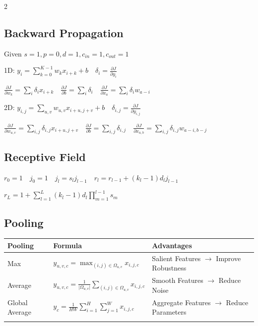 \documentclass[a4paper]{article}
\newlength{\activationwidth}
\let\originalsum\sum
\let\originalprod\prod
\renewcommand{\sum}{\mathop{\textstyle\originalsum}\nolimits}
\renewcommand{\prod}{\mathop{\textstyle\originalprod}\nolimits}
\begin{document}
\begin{multicols}{2}
\subsection*{Backward Propagation}
\noindent Given \(\displaystyle s=1, p=0, d=1, c_{in}=1, c_{out}=1\)\par
\noindent 1D: \(\displaystyle y_i=\sum_{k=0}^{K-1}w_kx_{i+k}+b \quad \delta_i=\frac{\partial J}{\partial y_i}\)\par
\noindent \(\displaystyle \frac{\partial J}{\partial w_k}=\sum_i\delta_i x_{i+k} \quad \frac{\partial J}{\partial b}=\sum_i\delta_i \quad \frac{\partial J}{\partial x_a}=\sum_i\delta_iw_{a-i}\)\par
\noindent 2D: \(\displaystyle y_{i,j}=\sum_{u,v}w_{u,v}x_{i+u,j+v}+b \quad \delta_{i,j}=\frac{\partial J}{\partial y_{i,j}}\)\par
\noindent \(\displaystyle \frac{\partial J}{\partial w_{u,v}}=\sum_{i,j}\delta_{i,j}x_{i+u,j+v} \quad \frac{\partial J}{\partial b}=\sum_{i,j}\delta_{i,j} \quad \frac{\partial J}{\partial x_{a,b}}=\sum_{i,j}\delta_{i,j}w_{a-i,b-j}\)\par
\subsection*{Receptive Field}
\noindent \(\displaystyle r_0=1 \quad j_0=1 \quad j_l=s_lj_{l-1} \quad r_l=r_{l-1}+(k_l-1)d_lj_{l-1}\)\par
\noindent \(\displaystyle r_L=1+\sum_{l=1}^{L}(k_l-1)d_l\prod_{m=1}^{l-1}s_m\)\par
\subsection*{Pooling}
\par\begingroup\fontsize{7}{8.5}\selectfont\setlength{\tabcolsep}{1.7pt}\renewcommand{\arraystretch}{1.55}\setlength{\activationwidth}{\dimexpr\linewidth-4\tabcolsep\relax}\noindent\begin{tabular}{@{}>{\raggedright\arraybackslash}m{.16\activationwidth}>{\centering\arraybackslash}m{.41\activationwidth}>{\raggedright\arraybackslash}m{.43\activationwidth}@{}}\toprule\textbf{Pooling} & \textbf{Formula} & \textbf{Advantages}\\\midrule
Max & \(\displaystyle y_{u,v,c}=\max_{(i,j)\in\Omega_{u,v}}x_{i,j,c}\) & Salient Features \(\to\) Improve Robustness\\\addlinespace[2pt]
Average & \(\displaystyle y_{u,v,c}=\frac{1}{\lvert\Omega_{u,v}\rvert}\sum_{(i,j)\in\Omega_{u,v}}x_{i,j,c}\) & Smooth Features \(\to\) Reduce Noise\\\addlinespace[2pt]
Global Average & \(\displaystyle y_c=\frac{1}{HW}\sum_{i=1}^{H}\sum_{j=1}^{W}x_{i,j,c}\) & Aggregate Features \(\to\) Reduce Parameters\\\addlinespace[2pt]
\bottomrule\end{tabular}\par\endgroup

\end{multicols}
\end{document}
